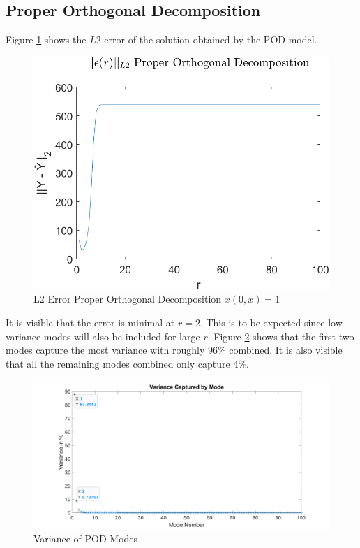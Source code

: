 \subsection{Proper Orthogonal Decomposition}
Figure \ref{FIG-ERR-POD} shows the \(L2\) error of the solution obtained by the POD model.
\begin{figure}[H]
\centering
\includegraphics[width=12.5cm]{images/L2_POD}
\caption{L2 Error Proper Orthogonal Decomposition $x(0, x) = 1$}
\label{FIG-ERR-POD}
\end{figure}
It is visible that the error is minimal at  \(r=2\).
This is to be expected since low variance modes will also be included for large \(r\).
Figure \ref{FIG-POD-VAR} shows that the first two modes capture the most variance with roughly 96\% combined.
It is also visible that all the remaining modes combined only capture 4\%.
\begin{figure}[H]
\centering
\includegraphics[width=12.5cm]{images/test_modes_pod}
\caption{Variance of POD Modes}
\label{FIG-POD-VAR}
\end{figure}
